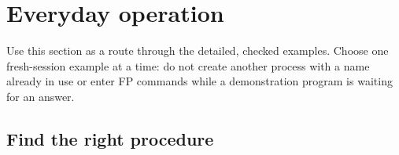 \chapter{Everyday operation}\label{everyday-operation}

Use this section as a route through the detailed, checked examples. Choose one fresh-session example at a time: do not create another process with a name already in use or enter FP commands while a demonstration program is waiting for an answer.

\section{Find the right procedure}\label{find-the-right-procedure}

